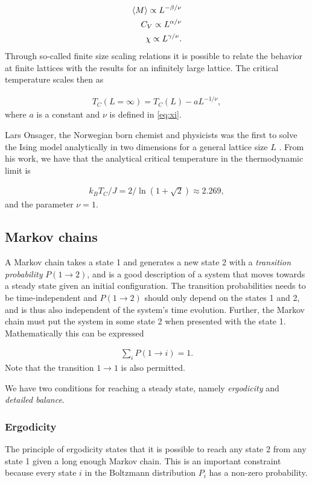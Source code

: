 \documentclass[../main.tex]{subfiles}
\begin{document}
\begin{align}
\begin{split}
    \braket{M}\propto L^{-\beta/\nu} \\
    C_V\propto L^{\alpha/\nu} \\
    \chi \propto L^{\gamma/\nu}. 
\end{split}
\end{align} Through so-called finite size scaling relations it is possible to relate the behavior at finite lattices with the results for an infinitely large lattice. The critical temperature scales then as

\begin{align}
    T_C(L=\infty)=T_C(L)-aL^{-1/\nu},
\end{align} where $a$ is a constant and $\nu$ is defined in \cref{eq:xi}. 

Lars Onsager, the Norwegian born chemist and physicists was the first to solve the Ising model analytically in two dimensions for a general lattice size $L$ \cite{Onsager1944}. From his work, we have that the analytical critical temperature in the thermodynamic limit is

\begin{align}
    k_BT_C/J=2/\ln(1+\sqrt{2})\approx2.269,
\end{align} and the parameter $\nu=1$.

\subsection{Markov chains}
A Markov chain takes a state 1 and generates a new state 2 with a \textit{transition probability} \ensuremath{P(1\rightarrow2)}, and is a good description of a system that moves towards a steady state given an initial configuration. The transition probabilities needs to be time-independent and $P(1\rightarrow2)$ should only depend on the states 1 and 2, and is thus also independent of the system's time evolution. Further, the Markov chain must put the system in some state 2 when presented with the state 1. Mathematically this can be expressed 

\begin{align}
    \sum_iP(1\rightarrow i)=1. 
\end{align} Note that the transition $1\rightarrow1$ is also permitted. 

We have two conditions for reaching a steady state, namely \textit{ergodicity} and \textit{detailed balance}. 

\subsubsection{Ergodicity}
The principle of ergodicity states that it is possible to reach any state 2 from any state 1 given a long enough Markov chain. This is an important constraint because every state $i$ in the Boltzmann distribution $P_i$ has a non-zero probability. 
\end{document}
